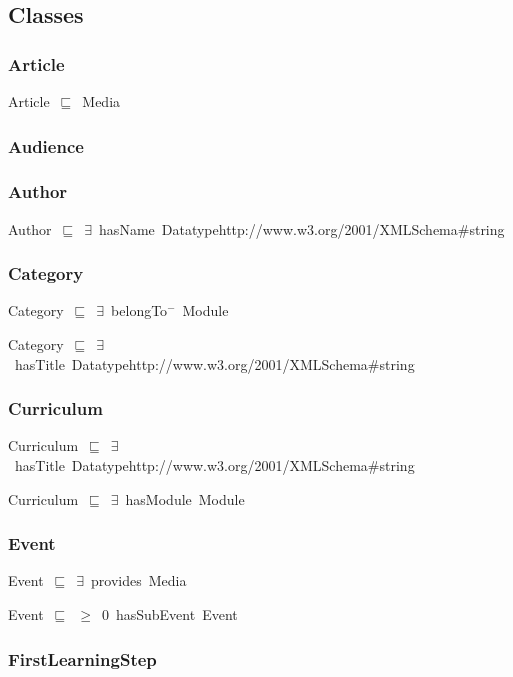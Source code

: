 \documentclass{article}
\begin{document}
\subsection*{Classes}

\subsubsection*{Article}

Article~\ensuremath{\sqsubseteq}~Media~

\subsubsection*{Audience}

\subsubsection*{Author}

Author~\ensuremath{\sqsubseteq}~\ensuremath{\exists}~hasName~Datatypehttp://www.w3.org/2001/XMLSchema#string~

\subsubsection*{Category}

Category~\ensuremath{\sqsubseteq}~\ensuremath{\exists}~belongTo\ensuremath{^-}~Module~

Category~\ensuremath{\sqsubseteq}~\ensuremath{\exists}~hasTitle~Datatypehttp://www.w3.org/2001/XMLSchema#string~

\subsubsection*{Curriculum}

Curriculum~\ensuremath{\sqsubseteq}~\ensuremath{\exists}~hasTitle~Datatypehttp://www.w3.org/2001/XMLSchema#string~

Curriculum~\ensuremath{\sqsubseteq}~\ensuremath{\exists}~hasModule~Module~

\subsubsection*{Event}

Event~\ensuremath{\sqsubseteq}~\ensuremath{\exists}~provides~Media~

Event~\ensuremath{\sqsubseteq}~\ensuremath{\geq}~0~hasSubEvent~Event~

\subsubsection*{FirstLearningStep}
\end{document}
